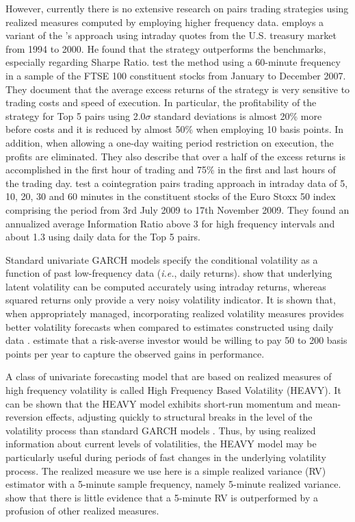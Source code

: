\documentclass[a4paper,12pt]{report}
\begin{document}
\begin{refsection}
However, currently there is no extensive research on pairs trading strategies using realized measures computed by employing higher frequency data. \citet*{nath2003high} employs a variant of the \citet*{ggr06}'s approach using intraday quotes from the U.S. treasury market from 1994 to 2000. He found that the strategy outperforms the benchmarks, especially regarding Sharpe Ratio. \citet*{bowen2010high} test the method using a 60-minute frequency in a sample of the FTSE 100 constituent stocks from January to December 2007. They document that the average excess returns of the strategy is very sensitive to trading costs and speed of execution. In particular, the profitability of the strategy for Top 5 pairs using 2.0$\sigma$ standard deviations is almost 20\% more before costs and it is reduced by almost 50\% when employing 10 basis points. In addition, when allowing a one-day waiting period restriction on execution, the profits are eliminated. They also describe that over a half of the excess returns is accomplished in the first hour of trading and 75\% in the first and last hours of the trading day. \citet*{dunis2010} test a cointegration pairs trading approach in intraday data of  5, 10, 20, 30 and 60 minutes in the constituent stocks of the Euro Stoxx 50 index comprising the period from 3rd July 2009 to 17th November 2009. They found an annualized average Information Ratio above 3 for high frequency intervals and about 1.3 using daily data for the Top 5 pairs.

Standard univariate GARCH models specify the conditional volatility as a function of past low-frequency data (\emph{i.e.}, daily returns). \citet*{andersen2001} show that underlying latent volatility can be computed accurately using intraday returns, whereas squared returns only provide a very noisy volatility indicator. It is shown that, when appropriately managed, incorporating realized volatility measures provides better volatility forecasts when compared to estimates constructed using daily data \citep{ss10,hansen2012realized}. \citet*{fleming2003} estimate that a risk-averse investor would be willing to pay 50 to 200 basis points per year to capture the observed gains in performance.

A class of univariate forecasting model that are based on realized measures of high frequency volatility is called High Frequency Based Volatility (HEAVY). It can be shown that the HEAVY model exhibits short-run momentum and mean-reversion effects, adjusting quickly to structural breaks in the level of the volatility process than standard GARCH models \citep{ss10}. Thus, by using realized information about current levels of volatilities, the HEAVY model may be particularly useful during periods of fast changes in the underlying volatility process. The realized measure we use here is a simple realized variance (RV) estimator with a 5-minute sample frequency, namely 5-minute realized variance. \citet*{liu2015does} show that there is little evidence that a 5-minute RV is outperformed by a profusion of other realized measures.


\end{refsection}
\end{document}
